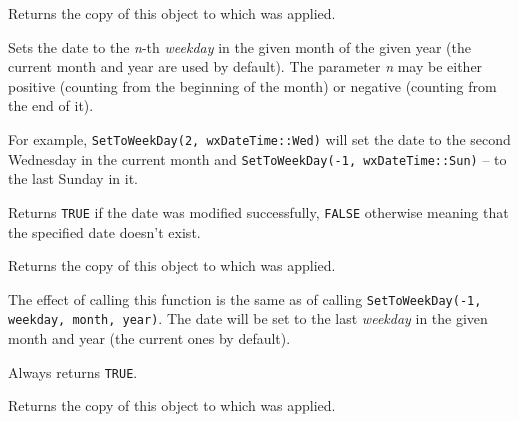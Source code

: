 
Returns the copy of this object to which
 was applied.

\label{wxdatetimesettoweekday}


Sets the date to the {\it n}-th {\it weekday} in the given month of the given
year (the current month and year are used by default). The parameter {\it n}
may be either positive (counting from the beginning of the month) or negative
(counting from the end of it).

For example, {\tt SetToWeekDay(2, wxDateTime::Wed)} will set the date to the
second Wednesday in the current month and
{\tt SetToWeekDay(-1, wxDateTime::Sun)} -- to the last Sunday in it.

Returns {\tt TRUE} if the date was modified successfully, {\tt FALSE}
otherwise meaning that the specified date doesn't exist.

\label{wxdatetimegetweekday2}


Returns the copy of this object to which
 was applied.

\label{wxdatetimesettolastweekday}


The effect of calling this function is the same as of calling
{\tt SetToWeekDay(-1, weekday, month, year)}. The date will be set to the last
{\it weekday} in the given month and year (the current ones by default).

Always returns {\tt TRUE}.

\label{wxdatetimegetlastweekday}


Returns the copy of this object to which
 was applied.

